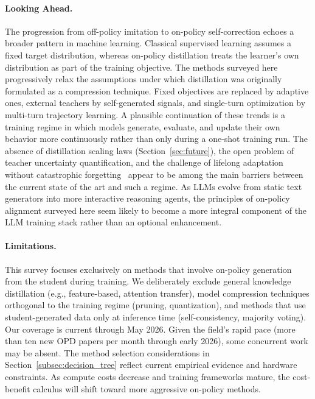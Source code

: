 \documentclass{article} %
\begin{document}
\paragraph{Looking Ahead.} The progression from off-policy imitation to on-policy self-correction echoes a broader pattern in machine learning. Classical supervised learning assumes a fixed target distribution, whereas on-policy distillation treats the learner's own distribution as part of the training objective. The methods surveyed here progressively relax the assumptions under which distillation was originally formulated as a compression technique. Fixed objectives are replaced by adaptive ones, external teachers by self-generated signals, and single-turn optimization by multi-turn trajectory learning. A plausible continuation of these trends is a training regime in which models generate, evaluate, and update their own behavior more continuously rather than only during a one-shot training run. The absence of distillation scaling laws (Section~\ref{sec:future}), the open problem of teacher uncertainty quantification, and the challenge of lifelong adaptation without catastrophic forgetting~\citep{1612.00796} appear to be among the main barriers between the current state of the art and such a regime. As LLMs evolve from static text generators into more interactive reasoning agents, the principles of on-policy alignment surveyed here seem likely to become a more integral component of the LLM training stack rather than an optional enhancement.

\paragraph{Limitations.} This survey focuses exclusively on methods that involve on-policy generation from the student during training. We deliberately exclude general knowledge distillation (e.g., feature-based, attention transfer), model compression techniques orthogonal to the training regime (pruning, quantization), and methods that use student-generated data only at inference time (self-consistency, majority voting). Our coverage is current through May 2026. Given the field's rapid pace (more than ten new OPD papers per month through early 2026), some concurrent work may be absent. The method selection considerations in Section~\ref{subsec:decision_tree} reflect current empirical evidence and hardware constraints. As compute costs decrease and training frameworks mature, the cost-benefit calculus will shift toward more aggressive on-policy methods.
\end{document}

